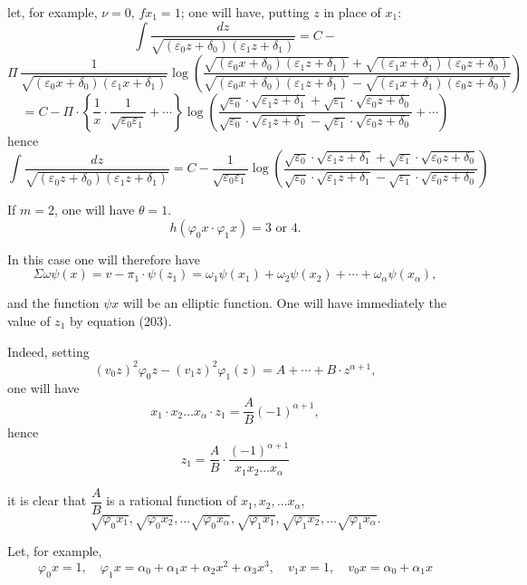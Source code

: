 \documentclass{article}
\begin{document}
let, for example, $\nu = 0$, $f x_1 = 1$; one will have, putting $z$ in place of $x_1$:
\[ \int \frac{dz}{\sqrt{(\varepsilon_0 z+\delta_0)(\varepsilon_1 z+\delta_1)}} = C - \]
\[ \Pi\,\frac{1}{\sqrt{(\varepsilon_0 x+\delta_0)(\varepsilon_1 x+\delta_1)}}\log\left(\frac{\sqrt{(\varepsilon_0 x+\delta_0)(\varepsilon_1 z+\delta_1)}+\sqrt{(\varepsilon_1 x+\delta_1)(\varepsilon_0 z+\delta_0)}}{\sqrt{(\varepsilon_0 x+\delta_0)(\varepsilon_1 z+\delta_1)}-\sqrt{(\varepsilon_1 x+\delta_1)(\varepsilon_0 z+\delta_0)}}\right) \]
\[ = C - \Pi \cdot \left\{ \frac{1}{x} \cdot \frac{1}{\sqrt{\varepsilon_0\varepsilon_1}}+\cdots \right\}\log\left(\frac{\sqrt{\varepsilon_0} \cdot \sqrt{\varepsilon_1 z+\delta_1}+\sqrt{\varepsilon_1} \cdot \sqrt{\varepsilon_0 z+\delta_0}}{\sqrt{\varepsilon_0} \cdot \sqrt{\varepsilon_1 z+\delta_1}-\sqrt{\varepsilon_1} \cdot \sqrt{\varepsilon_0 z+\delta_0}}+\cdots\right) \]
hence
\[ \int \frac{dz}{\sqrt{(\varepsilon_0 z+\delta_0)(\varepsilon_1 z+\delta_1)}} = C - \frac{1}{\sqrt{\varepsilon_0\varepsilon_1}}\log\left(\frac{\sqrt{\varepsilon_0} \cdot \sqrt{\varepsilon_1 z+\delta_1}+\sqrt{\varepsilon_1} \cdot \sqrt{\varepsilon_0 z+\delta_0}}{\sqrt{\varepsilon_0} \cdot \sqrt{\varepsilon_1 z+\delta_1}-\sqrt{\varepsilon_1} \cdot \sqrt{\varepsilon_0 z+\delta_0}}\right) \]

If $m = 2$, one will have $\theta = 1$.
\[ h(\varphi_0 x \cdot \varphi_1 x) = 3 \text{ or } 4. \]

In this case one will therefore have
\[ \Sigma\omega\psi(x) = v - \pi_1 \cdot \psi(z_1) = \omega_1\psi(x_1)+\omega_2\psi(x_2)+\cdots+\omega_\alpha\psi(x_\alpha), \tag{205} \]

and the function $\psi x$ will be an elliptic function.
One will have immediately the value of $z_1$ by equation (203).

Indeed, setting
\[ (v_0 z)^{2}\varphi_0 z-(v_1 z)^{2}\varphi_1(z) = A+\cdots+B \cdot z^{\alpha+1}, \]
one will have
\[ x_1 \cdot x_2 \ldots x_\alpha \cdot z_1 = \frac{A}{B}(-1)^{\alpha+1}, \]
hence
\[ z_1 = \frac{A}{B} \cdot \frac{(-1)^{\alpha+1}}{x_1 x_2 \ldots x_\alpha} \]

it is clear that $\dfrac{A}{B}$ is a rational function of $x_1, x_2, \ldots x_\alpha$,
\[ \sqrt{\varphi_0 x_1}, \sqrt{\varphi_0 x_2}, \ldots \sqrt{\varphi_0 x_\alpha}, \sqrt{\varphi_1 x_1}, \sqrt{\varphi_1 x_2}, \ldots \sqrt{\varphi_1 x_\alpha}. \]

Let, for example,
\[ \varphi_0 x = 1, \quad \varphi_1 x = \alpha_0+\alpha_1 x+\alpha_2 x^{2}+\alpha_3 x^{3}, \quad v_1 x = 1, \quad v_0 x = \alpha_0+\alpha_1 x \]
\end{document}
